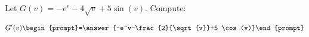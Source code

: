\documentclass{ximera}
\author{Bart Snapp}
\begin{document}
\begin{exercise}
Let $G(v) = -e^v-4 \sqrt{v}+5 \sin (v)$. Compute:

\[
G'(v)
\begin{prompt}=\answer{-e^v-\frac{2}{\sqrt{v}}+5 \cos (v)}\end{prompt}
\]
\end{exercise}
\end{document}
